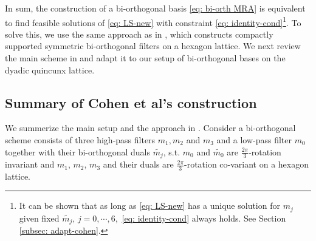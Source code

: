 In sum, the construction of a bi-orthogonal basis \eqref{eq: bi-orth MRA} is equivalent to find feasible solutions of \eqref{eq: LS-new} with constraint \eqref{eq: identity-cond}\footnote{It can be shown that as long as \eqref{eq: LS-new} has a unique solution for $m_j$ given fixed $\widetilde{m_j}, \, j = 0,\cdots,6,$ \eqref{eq: identity-cond} always holds. See Section \ref{subsec: adapt-cohen}.}. To solve this, we use the same approach as in \cite{cohen1993compactly}, which constructs compactly supported symmetric bi-orthogonal filters on a hexagon lattice. We next review the main scheme in \cite{cohen1993compactly} and adapt it to our setup of bi-orthogonal bases on the dyadic quincunx lattice.

\subsection{Summary of Cohen et al's construction}\label{subsec: cohen-summary}
We summerize the main setup and the approach in \cite{cohen1993compactly}. Consider a bi-orthogonal scheme consists of three high-pass filters $m_1,m_2$ and $m_3$ and a low-pass filter $m_0$ together with their bi-orthogonal duals $\widetilde{m_j}$, s.t.
$m_0$ and $\widetilde{m_0}$ are $\frac{2\pi}{3}$-rotation invariant and $m_1,\, m_2,\, m_3$ and their duals are $\frac{2\pi}{3}$-rotation co-variant on a hexagon lattice.

